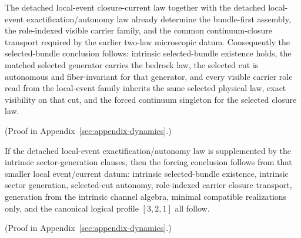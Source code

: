 \begin{theorem}
\label{thm:local-event-microscopic-law-recovers-selected-bundle-surface}
The detached local-event closure-current law together with the detached
local-event exactification/autonomy law already determine the bundle-first
assembly, the role-indexed visible carrier family, and the common
continuum-closure transport required by the earlier two-law microscopic
datum. Consequently the selected-bundle conclusion follows: intrinsic
selected-bundle existence holds, the matched selected generator
carries the bedrock law, the selected cut is autonomous and fiber-invariant
for that generator, and every visible carrier role read from the local-event
family inherits the same selected physical law, exact visibility on that cut,
and the forced continuum singleton for the selected closure law.
\end{theorem}

(Proof in Appendix~\ref{sec:appendix-dynamics}.)

\begin{corollary}
\label{cor:local-event-microscopic-sector-law-closes-current-forcing-seam}
If the detached local-event exactification/autonomy law is supplemented by the
intrinsic sector-generation clauses, then the forcing conclusion follows from
that smaller local event/current
datum: intrinsic selected-bundle existence, intrinsic sector generation,
selected-cut autonomy, role-indexed carrier closure transport, generation from
the intrinsic channel algebra, minimal compatible realizations only, and the
canonical logical profile \([3,2,1]\) all follow.
\end{corollary}

(Proof in Appendix~\ref{sec:appendix-dynamics}.)

